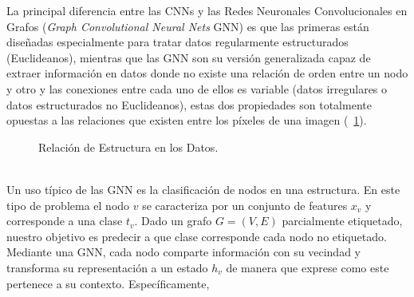 	La principal diferencia entre las CNNs y las Redes Neuronales Convolucionales en Grafos (\textit{Graph Convolutional Neural Nets }GNN) es que las primeras están diseñadas especialmente para tratar datos regularmente estructurados (Euclideanos), mientras que las GNN son su versión generalizada capaz de extraer información en datos donde no existe una relación de orden entre un nodo y otro y las conexiones entre cada uno de ellos es variable (datos irregulares o datos estructurados no Euclideanos), estas dos propiedades son totalmente opuestas a las relaciones que existen entre los píxeles de una imagen (\figurename~\ref{euclidian-non}).
	\begin{figure}[!thb]
		\centering
		 \hspace{10mm}
		\caption[Relación de Estructura en los Datos]{Relación de Estructura en los Datos. \citep{Wu_2021}}
		\label{euclidian-non}
	\end{figure}
	\\
	Un uso típico de las GNN es la clasificación de nodos en una estructura. En este tipo de problema el nodo $v$ se caracteriza por un conjunto de features $x_v$ y corresponde a una clase $t_v$. Dado un grafo $G = (V, E)$ parcialmente etiquetado, nuestro objetivo es predecir a que clase corresponde cada nodo no etiquetado. Mediante una GNN, cada nodo comparte información con su vecindad y transforma su representación a un estado $h_v$ de manera que exprese como este pertenece a su contexto. Específicamente,	
